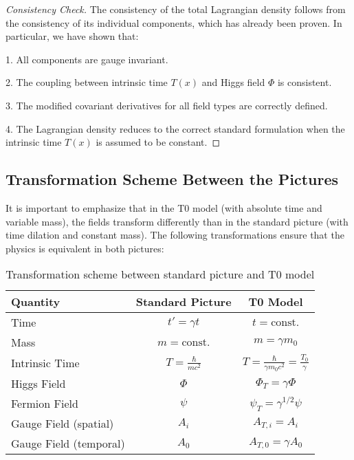 \documentclass{article}
\theoremstyle{definition}
\theoremstyle{remark}
\newcommand{\Tfield}{T(x)} %
\begin{document}
	\begin{proof}[Consistency Check]
		The consistency of the total Lagrangian density follows from the consistency of its individual components, which has already been proven. In particular, we have shown that:
		
		1. All components are gauge invariant.
		
		2. The coupling between intrinsic time $\Tfield$ and Higgs field $\Phi$ is consistent.
		
		3. The modified covariant derivatives for all field types are correctly defined.
		
		4. The Lagrangian density reduces to the correct standard formulation when the intrinsic time $\Tfield$ is assumed to be constant.
	\end{proof}
	
	\subsection{Transformation Scheme Between the Pictures}
	
	It is important to emphasize that in the T0 model (with absolute time and variable mass), the fields transform differently than in the standard picture (with time dilation and constant mass). The following transformations ensure that the physics is equivalent in both pictures:
	
	\begin{table}[h]
		\centering
		\begin{tabular}{|l|c|c|}
			\hline
			\textbf{Quantity} & \textbf{Standard Picture} & \textbf{T0 Model} \\
			\hline
			Time & $t' = \gamma t$ & $t = \text{const.}$ \\
			Mass & $m = \text{const.}$ & $m = \gamma m_0$ \\
			Intrinsic Time & $T = \frac{\hbar}{mc^2}$ & $T = \frac{\hbar}{\gamma m_0c^2} = \frac{T_0}{\gamma}$ \\
			Higgs Field & $\Phi$ & $\Phi_T = \gamma \Phi$ \\
			Fermion Field & $\psi$ & $\psi_T = \gamma^{1/2} \psi$ \\
			Gauge Field (spatial) & $A_i$ & $A_{T,i} = A_i$ \\
			Gauge Field (temporal) & $A_0$ & $A_{T,0} = \gamma A_0$ \\
			\hline
		\end{tabular}
		\caption{Transformation scheme between standard picture and T0 model}
	\end{table}
	
\end{document}
